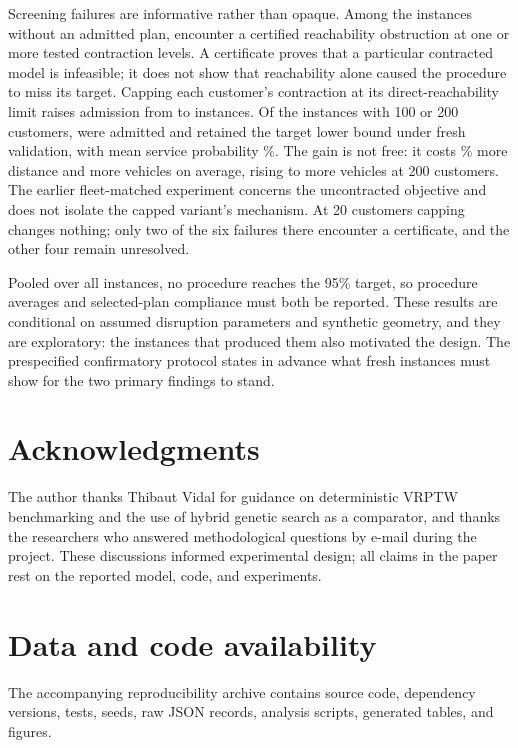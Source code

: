 \documentclass[11pt,a4paper]{article}
\begin{document}
Screening failures are informative rather than opaque. Among the
\FailureCount{} instances without an admitted plan, \CertifiedFailures{}
encounter a certified reachability obstruction at one or more tested
contraction levels. A certificate proves that a particular contracted model is
infeasible; it does not show that reachability alone caused the procedure to
miss its target. Capping each customer's contraction at its
direct-reachability limit raises admission from \OriginalSelected{} to
\CappedSelected{} instances. Of the instances with 100 or 200 customers,
\CappedLargeSelected{} were admitted and \CappedLargeRetained{} retained the
target lower bound under fresh validation, with mean service probability
\CappedLargeRange\%. The gain is not free: it costs \CappedDistanceCost\% more
distance and \CappedFleetCost{} more vehicles on average, rising to
\CappedFleetLarge{} more vehicles at 200 customers. The earlier fleet-matched
experiment concerns the uncontracted objective and does not isolate the
capped variant's mechanism. At 20 customers capping changes nothing; only two
of the six failures there encounter a certificate, and the other four remain
unresolved.

Pooled over all instances, no procedure reaches the 95\% target, so procedure
averages and selected-plan compliance must both be reported. These results are
conditional on assumed disruption parameters and synthetic geometry, and they
are exploratory: the instances that produced them also motivated the design.
The prespecified confirmatory protocol states in advance what fresh
instances must show for the two primary findings to stand.

\section*{Acknowledgments}

The author thanks Thibaut Vidal for guidance on deterministic VRPTW
benchmarking and the use of hybrid genetic search as a comparator, and thanks
the researchers who answered methodological questions by e-mail during the
project. These discussions
informed experimental design; all claims in the paper rest on the reported
model, code, and experiments.

\section*{Data and code availability}

The accompanying reproducibility archive contains source code, dependency
versions, tests, seeds, raw JSON records, analysis scripts, generated tables,
and figures.
\end{document}

